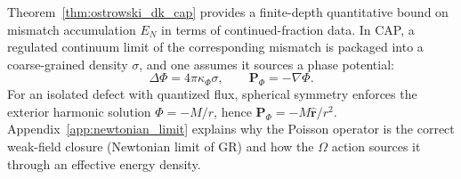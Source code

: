 Theorem~\ref{thm:ostrowski_dk_cap} provides a finite-depth quantitative bound on mismatch accumulation $E_N$ in terms of continued-fraction data. In CAP, a regulated continuum limit of the corresponding mismatch is packaged into a coarse-grained density $\sigma$, and one assumes it sources a phase potential:
\begin{equation}
  \Delta\Phi = 4\pi\kappa_{\Phi}\sigma,
  \qquad
  \mathbf{P}_{\Phi}=-\nabla\Phi.
\end{equation}
For an isolated defect with quantized flux, spherical symmetry enforces the exterior harmonic solution $\Phi=-M/r$, hence $\mathbf{P}_{\Phi}=-M\hat{\mathbf{r}}/r^2$. Appendix~\ref{app:newtonian_limit} explains why the Poisson operator is the correct weak-field closure (Newtonian limit of GR) and how the $\Omega$ action sources it through an effective energy density.



